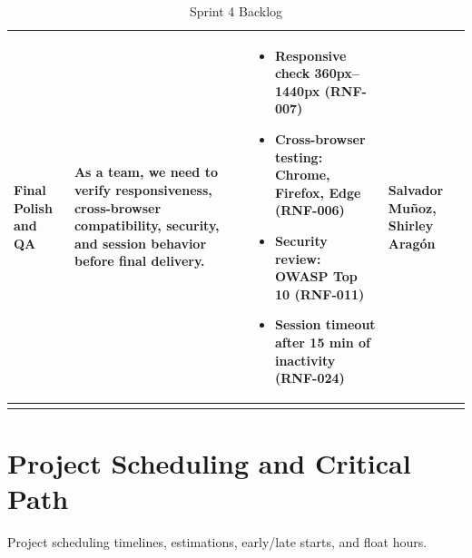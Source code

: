\documentclass[letterpaper%
, oneside%
, 12pt%
, memoireprojet%
, english%
,creativecommons,hyperref, withAlgo2e %
]{thETS}
\begin{document}
\begin{longtable}{|p{3.2cm}|p{4.4cm}|p{5.4cm}|p{3.0cm}|}
Final Polish and QA & As a team, we need to verify responsiveness, cross-browser compatibility, security, and session behavior before final delivery. & \begin{itemize}\setlength{\itemsep}{2pt}
    \item Responsive check 360px--1440px (RNF-007)
    \item Cross-browser testing: Chrome, Firefox, Edge (RNF-006)
    \item Security review: OWASP Top 10 (RNF-011)
    \item Session timeout after 15 min of inactivity (RNF-024)
\end{itemize} & Salvador Muñoz, Shirley Aragón \\ \hline
\caption{Sprint 4 Backlog}
\label{tab:sprint4_backlog}
\end{longtable}
\endgroup







\newpage
\section{Project Scheduling and Critical Path}
Project scheduling timelines, estimations, early/late starts, and float hours.
\end{document}
